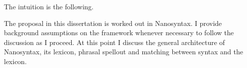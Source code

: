 The intuition is the following.







The proposal in this dissertation is worked out in Nanosyntax. I provide background assumptions on the framework whenever necessary to follow the discussion as I proceed. At this point I discuss the general architecture of Nanosyntax, its lexicon, phrasal spellout and matching between syntax and the lexicon.

